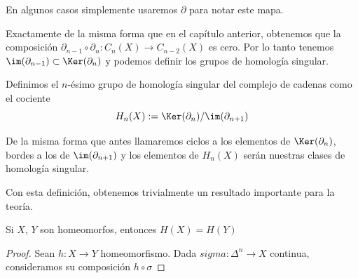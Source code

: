 En algunos casos simplemente usaremos $\partial$ para notar este mapa.\br

Exactamente de la misma forma que en el capítulo anterior, obtenemos que la composición $\partial_{n-1}\circ\partial_n :C_{n}(X)\to C_{n-2}(X)$ es cero. Por lo tanto tenemos $\im(\partial_{n-1})\subset\Ker(\partial_{n})$ y podemos definir los grupos de homología singular.\br

\begin{df}
Definimos el $n$-ésimo grupo de homología singular del complejo de cadenas como el cociente $$H_n(X):=\Ker(\partial_n)/\im(\partial_{n+1})$$\br

De la misma forma que antes llamaremos ciclos a los elementos de $\Ker(\partial_n)$, bordes a los de $\im(\partial_{n+1})$ y los elementos de $H_n(X)$ serán nuestras clases de homología singular.\br 
\end{df}

Con esta definición, obtenemos trivialmente un resultado importante para la teoría.

\begin{prop}
Si $X$, $Y$ son homeomorfos, entonces $H(X)=H(Y)$
\end{prop}
\begin{proof}
Sean $h:X\to Y$ homeomorfismo. Dada $sigma:\Delta^n\to X$ continua, consideramos su composición $h\circ\sigma$
\end{proof}